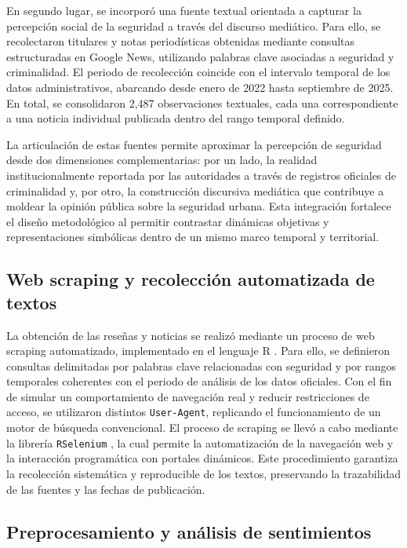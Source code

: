 \documentclass[sn-basic,pdflatex]{sn-jnl}
\theoremstyle{remark}
\theoremstyle{definition}
\begin{document}
En segundo lugar, se incorporó una fuente textual orientada a capturar
la percepción social de la seguridad a través del discurso mediático.
Para ello, se recolectaron titulares y notas periodísticas obtenidas
mediante consultas estructuradas en Google News, utilizando palabras
clave asociadas a seguridad y criminalidad. El periodo de recolección
coincide con el intervalo temporal de los datos administrativos,
abarcando desde enero de 2022 hasta septiembre de 2025. En total, se
consolidaron 2,487 observaciones textuales, cada una correspondiente a
una noticia individual publicada dentro del rango temporal definido.

La articulación de estas fuentes permite aproximar la percepción de
seguridad desde dos dimensiones complementarias: por un lado, la
realidad institucionalmente reportada por las autoridades a través de
registros oficiales de criminalidad y, por otro, la construcción
discursiva mediática que contribuye a moldear la opinión pública sobre
la seguridad urbana. Esta integración fortalece el diseño metodológico
al permitir contrastar dinámicas objetivas y representaciones simbólicas
dentro de un mismo marco temporal y territorial.

\subsection{Web scraping y recolección automatizada de
textos}\label{web-scraping-y-recolecciuxf3n-automatizada-de-textos}

La obtención de las reseñas y noticias se realizó mediante un proceso de
web scraping automatizado, implementado en el lenguaje R
\citep{rcore2024}. Para ello, se definieron consultas delimitadas por
palabras clave relacionadas con seguridad y por rangos temporales
coherentes con el periodo de análisis de los datos oficiales. Con el fin
de simular un comportamiento de navegación real y reducir restricciones
de acceso, se utilizaron distintos \texttt{User-Agent}, replicando el
funcionamiento de un motor de búsqueda convencional. El proceso de
scraping se llevó a cabo mediante la librería \texttt{RSelenium}
\citep{harrison2022}, la cual permite la automatización de la navegación
web y la interacción programática con portales dinámicos. Este
procedimiento garantiza la recolección sistemática y reproducible de los
textos, preservando la trazabilidad de las fuentes y las fechas de
publicación.

\subsection{Preprocesamiento y análisis de
sentimientos}\label{preprocesamiento-y-anuxe1lisis-de-sentimientos}
\end{document}
